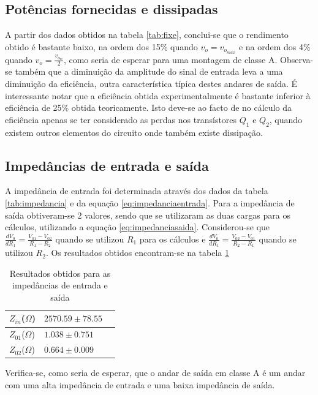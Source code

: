 \documentclass[%
  reprint,
  nofootinbib,
  amsmath,amssymb,
  aps,
  10pt,
  a4paper
]{revtex4-1}
\begin{document}
\subsection{Potências fornecidas e dissipadas}
A partir dos dados obtidos na tabela \ref{tab:fixe}, conclui-se que o rendimento obtido é bastante baixo, na ordem dos 15\% quando $v_o=v_{o_{max}}$ e na ordem dos 4\% quando $v_o=\frac{v_{o_m}}{2}$, como seria de esperar para uma montagem de classe A. Observa-se também que a diminuição da amplitude do sinal de entrada leva a uma diminuição da eficiência, outra característica típica destes andares de saída.  É interessante notar que a eficiência obtida  experimentalmente é bastante inferior à eficiência de 25\% obtida teoricamente. Isto deve-se ao facto de no cálculo da eficiência apenas se ter considerado as perdas nos transístores $Q_1$ e $Q_2$, quando existem outros elementos do circuito onde também existe dissipação.

\subsection{Impedâncias de entrada e saída}
A impedância de entrada foi determinada através dos dados da tabela \ref{tab:impedancia} e da equação \ref{eq:impedanciaentrada}. Para a impedância de saída obtiveram-se 2 valores, sendo que se utilizaram as duas cargas para os cálculos, utilizando a equação \ref{eq:impedanciasaida}. Considerou-se que $\frac{dV_0}{dR_1}=\frac{V_{01}-V_{02}}{R_1-R_2}$ quando se utilizou $R_1$ para os cálculos e $\frac{dV_0}{dR_1}=\frac{V_{02}-V_{01}}{R_2-R_1}$ quando se utilizou $R_2$. Os resultados obtidos encontram-se na tabela \ref{tab:analiseimpedancias}


\begin{table}[h]
    \begin{tabular}{|l|l|l|}
    \hline
    $Z_{in}$($\Omega$) & $2570.59 \pm 78.55$ \\ \hline
    $Z_{01}$($\Omega$) & $1.038\pm 0.751$  \\ \hline
    $Z_{02}$($\Omega$) & $0.664\pm0.009$  \\ \hline
    \end{tabular}
\caption{Resultados obtidos para as impedâncias de entrada e saída}
\label{tab:analiseimpedancias}
\end{table}

Verifica-se, como seria de esperar, que o andar de saída em classe A é um andar com uma alta impedância de entrada e uma baixa impedância de saída.
\end{document}
